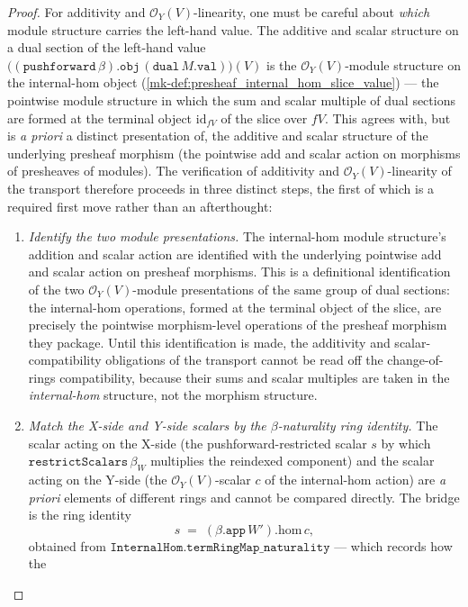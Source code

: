 \begin{proof}
  For additivity and \(\mathcal{O}_Y(V)\)-linearity, one must be careful about \emph{which}
  module structure carries the left-hand value. The additive and scalar structure on a dual
  section of the left-hand value
  \(\bigl((\mathtt{pushforward}\,\beta).\mathtt{obj}\,(\mathtt{dual}\,M.\mathtt{val})\bigr)(V)\)
  is the \(\mathcal{O}_Y(V)\)-module structure on the internal-hom object
  (\ref{mk-def:presheaf_internal_hom_slice_value}) --- the pointwise module structure in which the
  sum and scalar multiple of dual sections are formed at the terminal object \(\mathrm{id}_{fV}\)
  of the slice over \(fV\). This agrees with, but is \emph{a priori} a distinct presentation of,
  the additive and scalar structure of the underlying presheaf morphism (the pointwise add and
  scalar action on morphisms of presheaves of modules). The verification of additivity and
  \(\mathcal{O}_Y(V)\)-linearity of the transport therefore proceeds in three distinct steps, the
  first of which is a required first move rather than an afterthought:
  \begin{enumerate}
    \item[(i)] \emph{Identify the two module presentations.} The internal-hom module structure's
      addition and scalar action are identified with the underlying pointwise add and scalar action
      on presheaf morphisms. This is a definitional identification of the two
      \(\mathcal{O}_Y(V)\)-module presentations of the same group of dual sections: the
      internal-hom operations, formed at the terminal object of the slice, are precisely the
      pointwise morphism-level operations of the presheaf morphism they package. Until this
      identification is made, the additivity and scalar-compatibility obligations of the transport
      cannot be read off the change-of-rings compatibility, because their sums and scalar multiples
      are taken in the \emph{internal-hom} structure, not the morphism structure.
    \item[(ii)] \emph{Match the X-side and Y-side scalars by the \(\beta\)-naturality ring
      identity.} The scalar acting on the X-side (the pushforward-restricted scalar \(s\) by
      which \(\mathtt{restrictScalars}\,\beta_W\) multiplies the reindexed component) and the
      scalar acting on the Y-side (the \(\mathcal{O}_Y(V)\)-scalar \(c\) of the internal-hom
      action) are \emph{a priori} elements of different rings and cannot be compared directly.
      The bridge is the ring identity
      \[
        s \;=\; (\beta.\mathtt{app}\,W').\mathrm{hom}\, c,
      \]
      obtained from \(\mathtt{InternalHom.termRingMap\_naturality}\) --- which records how the

\end{enumerate}
\end{proof}
